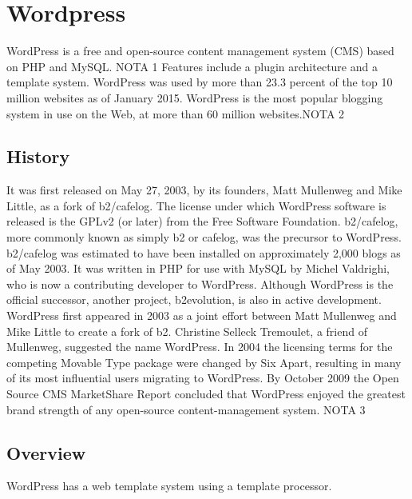 \section{Wordpress}
\label{sec:CMS_wp}

WordPress is a free and open-source content management system (CMS) based on PHP and MySQL. NOTA 1 Features include a plugin architecture and a template system. WordPress was used by more than 23.3 percent of the top 10 million websites as of January 2015. WordPress is the most popular blogging system in use on the Web, at more than 60 million websites.NOTA 2


\subsection{History}
\label{subsec:wp_his}
It was first released on May 27, 2003, by its founders, Matt Mullenweg and Mike Little, as a fork of b2/cafelog. The license under which WordPress software is released is the GPLv2 (or later) from the Free Software Foundation.
b2/cafelog, more commonly known as simply b2 or cafelog, was the precursor to WordPress. b2/cafelog was estimated to have been installed on approximately 2,000 blogs as of May 2003. It was written in PHP for use with MySQL by Michel Valdrighi, who is now a contributing developer to WordPress. Although WordPress is the official successor, another project, b2evolution, is also in active development.
WordPress first appeared in 2003 as a joint effort between Matt Mullenweg and Mike Little to create a fork of b2. Christine Selleck Tremoulet, a friend of Mullenweg, suggested the name WordPress.
In 2004 the licensing terms for the competing Movable Type package were changed by Six Apart, resulting in many of its most influential users migrating to WordPress. By October 2009 the Open Source CMS MarketShare Report concluded that WordPress enjoyed the greatest brand strength of any open-source content-management system. NOTA 3

\subsection{Overview}
\label{subsec:wp_overview}
WordPress has a web template system using a template processor.

